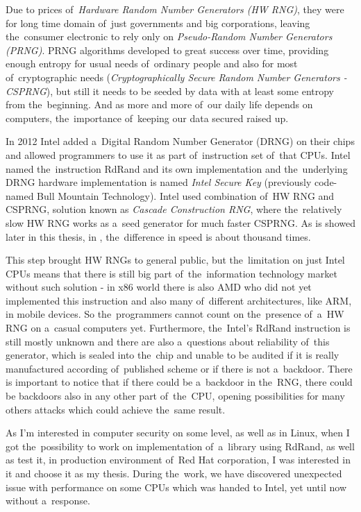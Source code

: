 Due to prices of~{\em Hardware Random Number Generators (HW RNG)}, they were for long time domain of~just governments and big corporations,%
leaving the~consumer electronic to rely only on {\em Pseudo-Random Number Generators (PRNG)}. PRNG algorithms developed to great success over time, providing enough entropy for usual needs of~ordinary people and also for most of~cryptographic needs ({\em Cryptographically Secure Random Number Generators - CSPRNG}), but still it needs to be seeded by data with at least some entropy from the~beginning. And as more and more of~our daily life depends on computers, the~importance of~keeping our data secured raised up. 

In 2012\cite{IntelRdRandFindAbout} Intel added a~Digital Random Number Generator (DRNG) on their chips and allowed programmers to use it as part of~instruction set of~that CPUs. Intel named the~instruction RdRand and its own implementation and the~underlying DRNG hardware implementation is named {\em Intel Secure Key} (previously code-named Bull Mountain Technology)\cite{IntelDRNGAnalysis}. Intel used combination of~HW RNG and CSPRNG, solution known as {\em Cascade Construction RNG}, where the~relatively slow HW RNG works as a~seed generator for much faster CSPRNG. As is showed later in this thesis, in , the~difference in speed is about thousand times.

This step brought HW RNGs to general public, but the~limitation on just Intel CPUs means that there is still big part of~the~information technology market without such solution - in x86 world there is also AMD who did not yet implemented this instruction and also many of~different architectures, like ARM, in mobile devices. So the~programmers cannot count on the~presence of~a~HW RNG on a~casual computers yet. Furthermore, the~Intel's RdRand instruction is still mostly unknown and there are also a~questions about reliability of~this generator, which is sealed into the~chip and unable to be audited\cite{TheodoreTsoNSA} if it is really manufactured according of~published scheme\cite{AnalysisOfDRNG} or if there is not a~backdoor. There is important to notice that if there could be a~backdoor in the~RNG, there could be backdoors also in any other part of~the~CPU, opening possibilities for many others attacks which could achieve the~same result.

As I'm interested in computer security on some level, as well as in Linux, when I got the~possibility to work on implementation of~a~library using RdRand, as well as test it, in production environment of~Red Hat corporation, I was interested in it and choose it as my thesis. During the~work, we have discovered unexpected issue with performance on some CPUs which was handed to Intel, yet until now without a~response.

